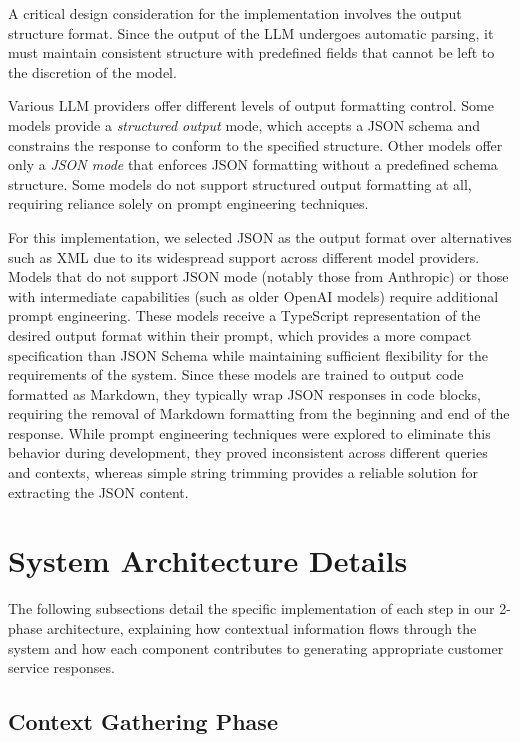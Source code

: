 A critical design consideration for the implementation involves the output structure format.
Since the output of the LLM undergoes automatic parsing, it must maintain consistent structure with predefined fields that cannot be left to the discretion of the model.

Various LLM providers offer different levels of output formatting control.
Some models provide a \textit{structured output} mode, which accepts a JSON schema and constrains the response to conform to the specified structure.
Other models offer only a \textit{JSON mode} that enforces JSON formatting without a predefined schema structure.
Some models do not support structured output formatting at all, requiring reliance solely on prompt engineering techniques.

For this implementation, we selected JSON as the output format over alternatives such as XML due to its widespread support across different model providers.
Models that do not support JSON mode (notably those from Anthropic) or those with intermediate capabilities (such as older OpenAI models) require additional prompt engineering.
These models receive a TypeScript representation of the desired output format within their prompt, which provides a more compact specification than JSON Schema while maintaining sufficient flexibility for the requirements of the system.
Since these models are trained to output code formatted as Markdown, they typically wrap JSON responses in code blocks, requiring the removal of Markdown formatting from the beginning and end of the response.
While prompt engineering techniques were explored to eliminate this behavior during development, they proved inconsistent across different queries and contexts, whereas simple string trimming provides a reliable solution for extracting the JSON content.

\section{System Architecture Details}

The following subsections detail the specific implementation of each step in our 2-phase architecture, explaining how contextual information flows through the system and how each component contributes to generating appropriate customer service responses.

\subsection{Context Gathering Phase}
\label{sec:context-gathering}

